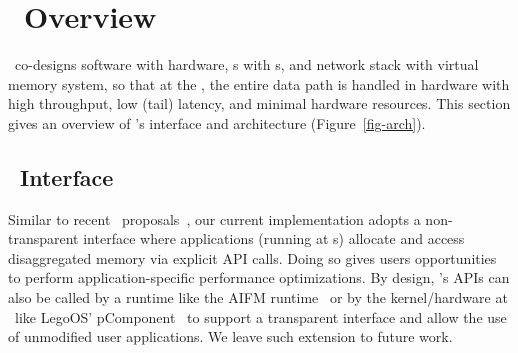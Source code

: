 

\section{\sys\ Overview}
\label{sec:hdm}

\sys\ co-designs software with hardware, \CN{}s with \MN{}s, and network stack with virtual memory system, 
so that at the \MN{}, the entire data path is handled in hardware with high throughput, low (tail) latency, and minimal hardware resources. 
This section gives an overview of \sys's interface and architecture (Figure~\ref{fig-arch}).




\subsection{\sys\ Interface}
\label{sec:abstraction}


Similar to recent \md\ proposals~\cite{AIFM,sebastian-hotcloud20}, our current implementation adopts a non-transparent interface where
applications (running at \CN{}s) allocate and access disaggregated memory via explicit API calls. Doing so gives users opportunities to perform application-specific performance optimizations. 
By design, \sys’s APIs can also be called by a runtime like the AIFM runtime~\cite{AIFM} or by the kernel/hardware at \CN\ like LegoOS' pComponent~\cite{Shan18-OSDI} to support a transparent interface and allow the use of unmodified user applications.
We leave such extension to future work.

